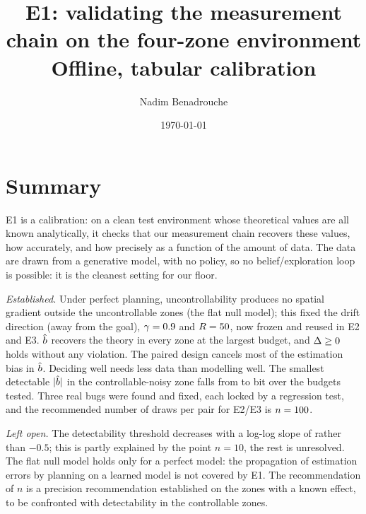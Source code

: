 \documentclass[10pt]{article}
\title{E1: validating the measurement chain on the four-zone environment\\[2pt]\large Offline, tabular calibration}
\author{Nadim Benadrouche}
\date{\today}
\begin{document}
\maketitle

\section*{Summary}

E1 is a calibration: on a clean test environment whose theoretical values are all known analytically, it checks that
our measurement chain recovers these values, how accurately, and how precisely as a function of the amount of data.
The data are drawn from a generative model, with no policy, so no belief/exploration loop is possible: it is the
cleanest setting for our floor.

\emph{Established.}
Under perfect planning, uncontrollability produces no spatial gradient outside the uncontrollable zones (the flat null
model); this fixed the drift direction (away from the goal), $\gamma = 0.9$ and $R = 50$, now
frozen and reused in E2 and E3.
$\hat{b}$ recovers the theory in every zone at the largest budget, and $\Delta \geq 0$ holds without any violation. %
The paired design cancels most of the estimation bias in $\hat{b}$.
Deciding well needs less data than modelling well.
The smallest detectable $|\hat{b}|$ in the controllable-noisy zone falls from \eOneThresholdTen{} to
\eOneThresholdThousand{} bit over the budgets tested.
Three real bugs were found and fixed, each locked by a regression test, and the recommended number of draws per pair
for E2/E3 is $n = 100$.

\emph{Left open.}
The detectability threshold decreases with a log-log slope of \eOneSlope{} rather than $-0.5$; this is partly explained %
by the point $n = 10$, the rest is unresolved. %
The flat null model holds only for a perfect model: the propagation of estimation errors by planning on a learned model
is not covered by E1.
The recommendation of $n$ is a precision recommendation established on the zones with a known effect, to be confronted
with detectability in the controllable zones.

\tableofcontents

\end{document}
